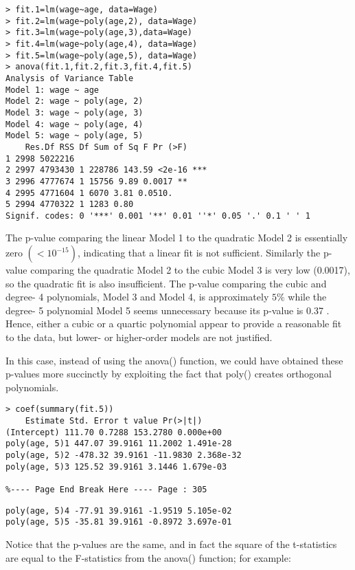 \documentclass[10pt]{article}
\begin{document}
\begin{verbatim}
> fit.1=lm(wage~age, data=Wage)
> fit.2=lm(wage~poly(age,2), data=Wage)
> fit.3=lm(wage~poly(age,3),data=Wage)
> fit.4=lm(wage~poly(age,4), data=Wage)
> fit.5=lm(wage~poly(age,5), data=Wage)
> anova(fit.1,fit.2,fit.3,fit.4,fit.5)
Analysis of Variance Table
Model 1: wage ~ age
Model 2: wage ~ poly(age, 2)
Model 3: wage ~ poly(age, 3)
Model 4: wage ~ poly(age, 4)
Model 5: wage ~ poly(age, 5)
    Res.Df RSS Df Sum of Sq F Pr (>F)
1 2998 5022216
2 2997 4793430 1 228786 143.59 <2e-16 ***
3 2996 4777674 1 15756 9.89 0.0017 **
4 2995 4771604 1 6070 3.81 0.0510.
5 2994 4770322 1 1283 0.80
Signif. codes: 0 '***' 0.001 '**' 0.01 ''*' 0.05 '.' 0.1 ' ' 1
\end{verbatim}

The p-value comparing the linear Model 1 to the quadratic Model 2 is essentially zero $\left(<10^{-15}\right)$, indicating that a linear fit is not sufficient. Similarly the p-value comparing the quadratic Model 2 to the cubic Model 3 is very low (0.0017), so the quadratic fit is also insufficient. The p-value comparing the cubic and degree- 4 polynomials, Model 3 and Model 4, is approximately $5 \%$ while the degree- 5 polynomial Model 5 seems unnecessary because its p-value is 0.37 . Hence, either a cubic or a quartic polynomial appear to provide a reasonable fit to the data, but lower- or higher-order models are not justified.

In this case, instead of using the anova() function, we could have obtained these p-values more succinctly by exploiting the fact that poly() creates orthogonal polynomials.

\begin{verbatim}
> coef(summary(fit.5))
    Estimate Std. Error t value Pr(>|t|)
(Intercept) 111.70 0.7288 153.2780 0.000e+00
poly(age, 5)1 447.07 39.9161 11.2002 1.491e-28
poly(age, 5)2 -478.32 39.9161 -11.9830 2.368e-32
poly(age, 5)3 125.52 39.9161 3.1446 1.679e-03

%---- Page End Break Here ---- Page : 305
\end{verbatim}

\begin{verbatim}
poly(age, 5)4 -77.91 39.9161 -1.9519 5.105e-02
poly(age, 5)5 -35.81 39.9161 -0.8972 3.697e-01
\end{verbatim}

Notice that the p-values are the same, and in fact the square of the t-statistics are equal to the F-statistics from the anova() function; for example:
\end{document}

